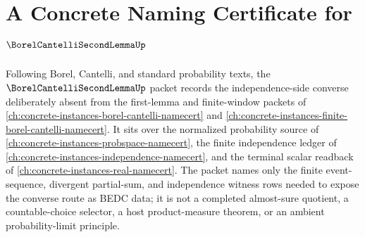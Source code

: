 \chapter{A Concrete Naming Certificate for $\BorelCantelliSecondLemmaUp$}
\label{ch:concrete-instances-borel-cantelli-second-lemma-namecert}

Following Borel, Cantelli, and standard probability texts, the $\BorelCantelliSecondLemmaUp$ packet records the independence-side converse deliberately absent from the first-lemma and finite-window packets of \autoref{ch:concrete-instances-borel-cantelli-namecert} and \autoref{ch:concrete-instances-finite-borel-cantelli-namecert}. It sits over the normalized probability source of \autoref{ch:concrete-instances-probspace-namecert}, the finite independence ledger of \autoref{ch:concrete-instances-independence-namecert}, and the terminal scalar readback of \autoref{ch:concrete-instances-real-namecert}. The packet names only the finite event-sequence, divergent partial-sum, and independence witness rows needed to expose the converse route as BEDC data; it is not a completed almost-sure quotient, a countable-choice selector, a host product-measure theorem, or an ambient probability-limit principle.

